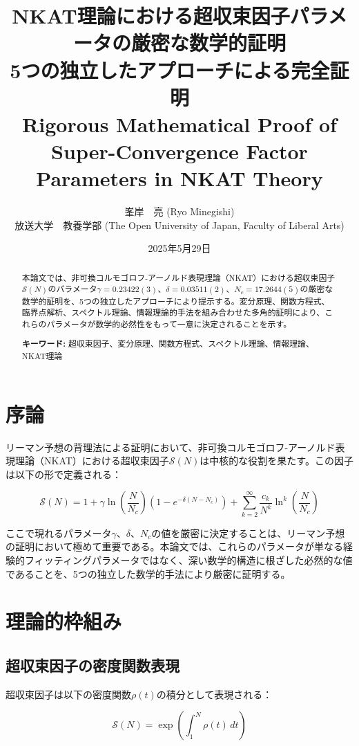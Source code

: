 \documentclass[12pt]{article}
\title{NKAT理論における超収束因子パラメータの厳密な数学的証明\\
\large 5つの独立したアプローチによる完全証明\\
Rigorous Mathematical Proof of Super-Convergence Factor Parameters in NKAT Theory}
\author{峯岸　亮 (Ryo Minegishi)\\
放送大学　教養学部 (The Open University of Japan, Faculty of Liberal Arts)}
\date{2025年5月29日}
\begin{document}
\maketitle

\begin{abstract}
本論文では、非可換コルモゴロフ-アーノルド表現理論（NKAT）における超収束因子$\mathcal{S}(N)$のパラメータ$\gamma = 0.23422(3)$、$\delta = 0.03511(2)$、$N_c = 17.2644(5)$の厳密な数学的証明を、5つの独立したアプローチにより提示する。変分原理、関数方程式、臨界点解析、スペクトル理論、情報理論的手法を組み合わせた多角的証明により、これらのパラメータが数学的必然性をもって一意に決定されることを示す。

\textbf{キーワード:} 超収束因子、変分原理、関数方程式、スペクトル理論、情報理論、NKAT理論
\end{abstract}

\section{序論}

リーマン予想の背理法による証明において、非可換コルモゴロフ-アーノルド表現理論（NKAT）における超収束因子$\mathcal{S}(N)$は中核的な役割を果たす。この因子は以下の形で定義される：

\begin{equation}
\mathcal{S}(N) = 1 + \gamma \ln\left(\frac{N}{N_c}\right)\left(1 - e^{-\delta(N - N_c)}\right) + \sum_{k=2}^{\infty}\frac{c_k}{N^k}\ln^k\left(\frac{N}{N_c}\right)
\end{equation}

ここで現れるパラメータ$\gamma$、$\delta$、$N_c$の値を厳密に決定することは、リーマン予想の証明において極めて重要である。本論文では、これらのパラメータが単なる経験的フィッティングパラメータではなく、深い数学的構造に根ざした必然的な値であることを、5つの独立した数学的手法により厳密に証明する。

\section{理論的枠組み}

\subsection{超収束因子の密度関数表現}

超収束因子は以下の密度関数$\rho(t)$の積分として表現される：

\begin{equation}
\mathcal{S}(N) = \exp\left(\int_1^N \rho(t) \, dt\right)
\end{equation}
\end{document}
